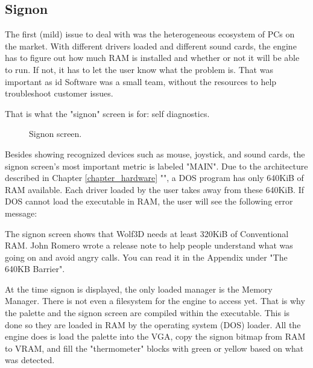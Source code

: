 \documentclass[book.tex]{subfiles}
\begin{document}
\subsection{Signon}
The first (mild) issue to deal with was the heterogeneous ecosystem of PCs on the market. With different drivers loaded and different sound cards, the engine has to figure out how much RAM is installed and whether or not it will be able to run. If not, it has to let the user know what the problem is. That was important as id Software was a small team, without the resources to help troubleshoot customer issues.\\
\par
That is what the "signon" screen is for: self diagnostics. 
\par
\begin{figure}[H]
\centering
{}
\caption{Signon screen.}
\end{figure}
\par
Besides showing recognized devices such as mouse, joystick, and sound cards, the signon screen's most important metric is labeled "MAIN". Due to the architecture described in Chapter \ref{chapter_hardware} "", a DOS program has only 640KiB of RAM available. Each driver loaded by the user takes away from these 640KiB. If DOS cannot load the executable in RAM, the user will see the following error message:\\
\par 
\begin{minipage}{\textwidth}

\end{minipage}
\par
The signon screen shows that Wolf3D needs at least 320KiB of Conventional RAM. John Romero wrote a release note to help people understand what was going on and avoid angry calls. You can read it in the Appendix under "The 640KB Barrier".\\
\par 
At the time signon is displayed, the only loaded manager is the Memory Manager. There is not even a filesystem for the engine to access yet. That is why the palette and the signon screen are compiled within the executable. This is done so they are loaded in RAM by the operating system (DOS) loader. All the engine does is load the palette into the VGA, copy the signon bitmap from RAM to VRAM, and fill the "thermometer" blocks with green or yellow based on what was detected.\\
\par
\end{document}
